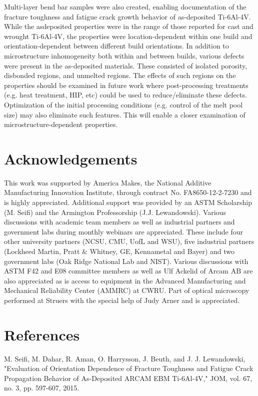 \documentclass[10pt]{article}
\begin{document}
Multi-layer bend bar samples were also created, enabling documentation of the fracture toughness and fatigue crack growth behavior of as-deposited Ti-6Al-4V. While the asdeposited properties were in the range of those reported for cast and wrought Ti-6Al-4V, the properties were location-dependent within one build and orientation-dependent between different build orientations. In addition to microstructure inhomogeneity both within and between builds, various defects were present in the as-deposited materials. These consisted of isolated porosity, disbonded regions, and unmelted regions. The effects of such regions on the properties should be examined in future work where post-processing treatments (e.g. heat treatment, HIP, etc) could be used to reduce/eliminate these defects. Optimization of the initial processing conditions (e.g. control of the melt pool size) may also eliminate such features. This will enable a closer examination of microstructure-dependent properties.

\section*{Acknowledgements}
This work was supported by America Makes, the National Additive Manufacturing Innovation Institute, through contract No. FA8650-12-2-7230 and is highly appreciated. Additional support was provided by an ASTM Scholarship (M. Seifi) and the Armington Professorship (J.J. Lewandowski). Various discussions with academic team members as well as industrial partners and government labs during monthly webinars are appreciated. These include four other university partners (NCSU, CMU, UofL and WSU), five industrial partners (Lockheed Martin, Pratt \& Whitney, GE, Kennametal and Bayer) and two government labs (Oak Ridge National Lab and NIST). Various discussions with ASTM F42 and E08 committee members as well as Ulf Ackelid of Arcam $\mathrm{AB}$ are also appreciated as is access to equipment in the Advanced Manufacturing and Mechanical Reliability Center (AMMRC) at CWRU. Part of optical microscopy performed at Struers with the special help of Judy Arner and is appreciated.

\section*{References}
M. Seifi, M. Dahar, R. Aman, O. Harrysson, J. Beuth, and J. J. Lewandowski, "Evaluation of Orientation Dependence of Fracture Toughness and Fatigue Crack Propagation Behavior of As-Deposited ARCAM EBM Ti-6Al-4V," JOM, vol. 67, no. 3, pp. 597-607, 2015.
\end{document}
